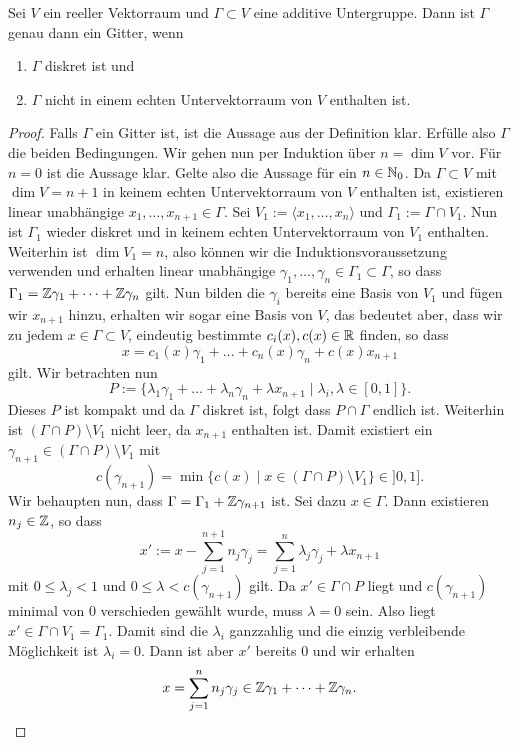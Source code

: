 \begin{lemma}
  \label{lemma:gitter}
  Sei $V$ ein reeller Vektorraum und $\Gamma \subset V$ eine additive
  Untergruppe. Dann ist $\Gamma$ genau dann ein Gitter, wenn
  \begin{enumerate}
  \item $\Gamma$ diskret ist und
  \item $\Gamma$ nicht in einem echten Untervektorraum von $V$
    enthalten ist.
  \end{enumerate}
\end{lemma}

\begin{proof}
  Falls $\Gamma$ ein Gitter ist, ist die Aussage aus der Definition
  klar. Erfülle also $\Gamma$ die beiden Bedingungen. Wir gehen nun
  per Induktion über $n = \dim V$ vor. Für $n = 0$ ist die Aussage klar. Gelte also die
  Aussage für ein $n \in \mathbb{N}_0$. Da $\Gamma \subset V$ mit $\dim V =
  n+1$ in keinem echten
  Untervektorraum von $V$ enthalten ist, existieren linear unabhängige $x_1, \dots,
  x_{n+1} \in \Gamma$. Sei $V_1 := \langle x_1, \dots, x_n \rangle$
  und $\Gamma_1 := \Gamma \cap V_1$. Nun ist $\Gamma_1$ wieder diskret
  und in keinem echten Untervektorraum von $V_1$ enthalten. Weiterhin
  ist $\dim V_1 = n$, also können wir die Induktionsvoraussetzung
  verwenden und erhalten linear unabhängige $\gamma_1, \dots, \gamma_n
  \in \Gamma_1 \subset \Gamma$, so dass $\Gamma_1 = \mathbb{Z} \gamma_1 +
  \dots + \mathbb{Z} \gamma_n$ gilt. Nun bilden die $\gamma_i$ bereits eine
  Basis von $V_1$ und fügen wir $x_{n+1}$ hinzu, erhalten wir sogar eine Basis
  von $V$, das bedeutet aber, dass wir zu jedem $x \in \Gamma \subset
  V$, eindeutig bestimmte $c_i(x), c(x) \in \mathbb{R}$ finden, so dass
  \[
  x = c_1(x) \gamma_1 + \dots + c_n(x) \gamma_n + c(x) x_{n+1}
  \]
  gilt. Wir betrachten nun
  \[
  P := \{ \lambda_1 \gamma_1 + \dots + \lambda_n \gamma_n + \lambda
  x_{n+1} \mid \lambda_i, \lambda \in [0,1] \}.
  \]
  Dieses $P$ ist kompakt und da $\Gamma$ diskret ist, folgt dass $P
  \cap \Gamma$ endlich ist. Weiterhin ist $( \Gamma \cap P) \setminus
  V_1$ nicht leer, da $x_{n+1}$ enthalten ist. Damit existiert ein
  $\gamma_{n+1} \in ( \Gamma \cap P) \setminus V_1$ mit
  \[
  c(\gamma_{n+1}) = \min \{ c(x) \mid x \in ( \Gamma \cap P ) \setminus
  V_1 \} \in ]0, 1].
  \]
  Wir behaupten nun, dass $\Gamma = \Gamma_1 + \mathbb{Z} \gamma_{n+1}$ ist. Sei
  dazu $x \in \Gamma$. Dann existieren $n_j \in \mathbb{Z}$, so dass
  \[
  x' := x - \sum_{j=1}^{n+1} n_j \gamma_j = \sum_{j=1}^n \lambda_j
  \gamma_j + \lambda x_{n+1}
  \]
  mit $0 \leq \lambda_j < 1$ und $0 \leq \lambda < c(\gamma_{n+1})$
  gilt. Da $x' \in \Gamma \cap P$ liegt und $c(\gamma_{n+1})$ minimal
  von 0 verschieden gewählt wurde, muss $\lambda = 0$ sein. Also liegt
  $x' \in \Gamma \cap V_1 = \Gamma_1$. Damit sind die $\lambda_i$
  ganzzahlig und die einzig verbleibende Möglichkeit ist $\lambda_i =
  0$. Dann ist aber $x'$ bereits 0 und wir erhalten 
  \[
  x = \sum_{j=1}^n n_j \gamma_j \in \mathbb{Z} \gamma_1 + \dots + \mathbb{Z} \gamma_n.
  \]
\end{proof}

